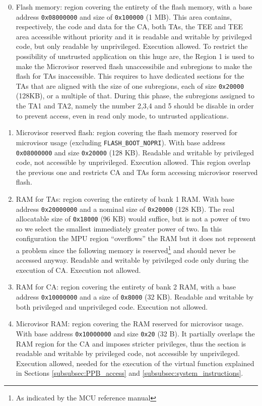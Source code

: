 \documentclass{article}
\begin{document}
\begin{enumerate}
	\setcounter{enumi}{-1}
	\item Flash memory: region covering the entirety of the flash memory, with a base address \verb|0x08000000| and size of \verb|0x100000| (1 MB). This area contains, respectively, the code and data for the CA, both TAs, the TEE and TEE area accessible without priority and it is readable and writable by privileged code, but only readable by unprivileged. Execution allowed. To restrict the possibility of unstrusted application on this huge are, the Region 1 is used to make the Microvisor reserved flash unaccessibile and subregions to make the flash for TAs inaccessible. This requires to have dedicated sections for the TAs that are aligned with the size of one subregions, each of size \verb|0x20000| (128KB), or a multiple of that. During this phase, the subregions assigned to the TA1 and TA2, namely the number 2,3,4 and 5 should be disable in order to prevent access, even in read only mode, to untrusted applications. 
	\item Microvisor reserved flash: region covering the flash memory reserved for microvisor usage (excluding \verb|FLASH_BOOT_NOPRI|). With base address \verb|0x08000000| and size \verb|0x20000| (128 KB). Readable and writable by privileged code, not accessible by unprivileged. Execution allowed. This region overlap the previous one and restricts CA and TAs form accessing microvisor reserved flash.
	\item RAM for TAs: region covering the entirety of bank 1 RAM. With base address \verb|0x20000000| and a nominal size of \verb|0x20000| (128 KB). The real allocatable size of \verb|0x18000| (96 KB) would suffice, but is not a power of two so we select the smallest immediately greater power of two. In this configuration the MPU region ``overflows'' the RAM but it does not represent a problem since the following memory is reserved\footnote{As indicated by the MCU reference manual\cite{rm0351}} and should never be accessed anyway. Readable and writable by privileged code only during the execution of CA. Execution not allowed.
    \item RAM for CA: region covering the entirety of bank 2 RAM, with a base address \verb|0x10000000| and a size of \verb|0x8000| (32 KB). Readable and writable by both privileged and unprivileged code. Execution not allowed.
	\item Microvisor RAM: region covering the RAM reserved for microvisor usage. With base address \verb|0x10000000| and size \verb|0x20| (32 B). It partially overlaps the RAM region for the CA and imposes stricter privileges, thus the section is readable and writable by privileged code, not accessible by unprivileged. Execution allowed, needed for the execution of the virtual function explained in Sections \ref{subsubsec:PPB_access} and \ref{subsubsec:system_instructions}.

\end{enumerate}
\end{document}

